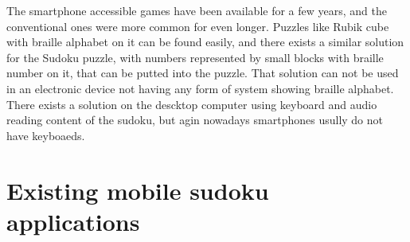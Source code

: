\documentclass[a4paper,twoside,12pt]{book}
\begin{document}
\par
The smartphone accessible games have been available for a few years, and the conventional ones were more common for even longer. Puzzles like Rubik cube with braille alphabet on it can be found easily, and there exists a similar solution for the Sudoku puzzle, with numbers represented by small blocks with braille number on it, that can be putted into the puzzle. That solution can not be used in an electronic device not having any form of system showing braille alphabet. There exists a solution on the descktop computer using keyboard and audio reading content of the sudoku, but agin nowadays smartphones usully do not have keyboaeds. 

\section {Existing mobile sudoku applications}
\end{document}
